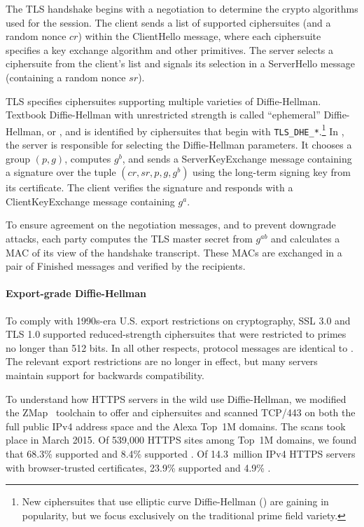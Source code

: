 The TLS handshake begins with a negotiation to determine the crypto
algorithms used for the session. The client sends a list of supported
ciphersuites (and a random nonce $cr$) within the \textsf{ClientHello}
message, where each ciphersuite specifies a key exchange algorithm and other
primitives. The server selects a ciphersuite from the client's list and
signals its selection in a \textsf{ServerHello} message (containing a random
nonce $sr$).

TLS specifies ciphersuites supporting multiple varieties of Diffie-Hellman.
Textbook Diffie-Hellman with unrestricted strength is called ``ephemeral''
Diffie-Hellman, or \dhe{}, and is identified by ciphersuites that begin with
\texttt{TLS\_DHE\_*}.\footnote{\small New ciphersuites that use elliptic
curve Diffie-Hellman (\ecdhe{}) are gaining in popularity, but we focus
exclusively on the traditional prime field variety.} In \dhe{}, the server is
responsible for selecting the Diffie-Hellman parameters. It chooses a group
$(p,g)$, computes $g^b$, and sends a \textsf{ServerKeyExchange} message
containing a signature over the tuple $(cr, sr, p, g, g^b)$ using the
long-term signing key from its certificate. The client verifies the signature
and responds with a \textsf{ClientKeyExchange} message containing $g^a$.

To ensure agreement on the negotiation messages, and to prevent downgrade
attacks, each party computes the TLS master secret from $g^{ab}$ and
calculates a MAC of its view of the handshake transcript. These MACs are
exchanged in a pair of \textsf{Finished} messages and verified by the
recipients.

\paragraph{Export-grade Diffie-Hellman}
To comply with 1990s-era U.S. export restrictions on cryptography, SSL 3.0
and TLS 1.0 supported reduced-strength \dheexp{} ciphersuites that were
restricted to primes no longer than 512 bits. In all other respects,
\dheexp{} protocol messages are identical to \dhe{}. The relevant export
restrictions are no longer in effect, but many servers maintain support for
backwards compatibility.

To understand how HTTPS servers in the wild use Diffie-Hellman, we modified
the ZMap~\cite{zmap-2013} toolchain to offer \dhe{} and \dheexp{}
ciphersuites and scanned TCP/443 on both the full public IPv4 address space
and the Alexa Top~1M domains. The scans took place in March 2015. Of 539,000
HTTPS sites among Top~1M domains, we found that 68.3\% supported \dhe{} and
8.4\% supported \dheexp{}. Of 14.3~million IPv4 HTTPS servers with
browser-trusted certificates, 23.9\% supported \dhe{} and 4.9\% \dheexp{}.


